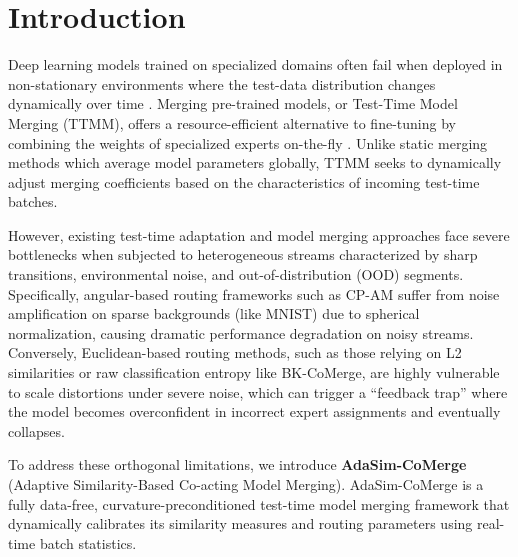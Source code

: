 \documentclass{article}
\theoremstyle{plain}
\theoremstyle{definition}
\theoremstyle{remark}
\begin{document}
\section{Introduction}
\label{sec:intro}

Deep learning models trained on specialized domains often fail when deployed in non-stationary environments where the test-data distribution changes dynamically over time \cite{tent2021, modelsoups2022}. Merging pre-trained models, or Test-Time Model Merging (TTMM), offers a resource-efficient alternative to fine-tuning by combining the weights of specialized experts on-the-fly \cite{zipit2023, taskarithmetic2023}. Unlike static merging methods which average model parameters globally, TTMM seeks to dynamically adjust merging coefficients based on the characteristics of incoming test-time batches.

However, existing test-time adaptation and model merging approaches face severe bottlenecks when subjected to heterogeneous streams characterized by sharp transitions, environmental noise, and out-of-distribution (OOD) segments. Specifically, angular-based routing frameworks such as CP-AM suffer from noise amplification on sparse backgrounds (like MNIST) due to spherical normalization, causing dramatic performance degradation on noisy streams. Conversely, Euclidean-based routing methods, such as those relying on L2 similarities or raw classification entropy like BK-CoMerge, are highly vulnerable to scale distortions under severe noise, which can trigger a ``feedback trap'' where the model becomes overconfident in incorrect expert assignments and eventually collapses.

To address these orthogonal limitations, we introduce \textbf{AdaSim-CoMerge} (Adaptive Similarity-Based Co-acting Model Merging). AdaSim-CoMerge is a fully data-free, curvature-preconditioned test-time model merging framework that dynamically calibrates its similarity measures and routing parameters using real-time batch statistics. 
\end{document}
